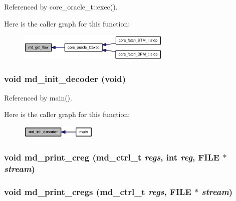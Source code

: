 Referenced by core\_\-oracle\_\-t::exec().

Here is the caller graph for this function:\nopagebreak
\begin{figure}[H]
\begin{center}
\leavevmode
\includegraphics[width=206pt]{machine_8h_b3f57fdb0b3410ba51dc0eafadbaeae8_icgraph}
\end{center}
\end{figure}
\subsubsection[{md\_\-init\_\-decoder}]{\setlength{\rightskip}{0pt plus 5cm}void md\_\-init\_\-decoder (void)}\label{machine_8h_adb08fced61010eb60f1ea634d307228}




Referenced by main().

Here is the caller graph for this function:\nopagebreak
\begin{figure}[H]
\begin{center}
\leavevmode
\includegraphics[width=103pt]{machine_8h_adb08fced61010eb60f1ea634d307228_icgraph}
\end{center}
\end{figure}
\subsubsection[{md\_\-print\_\-creg}]{\setlength{\rightskip}{0pt plus 5cm}void md\_\-print\_\-creg ({\bf md\_\-ctrl\_\-t} {\em regs}, \/  int {\em reg}, \/  FILE $\ast$ {\em stream})}\label{machine_8h_c63d5f30104aa29479fdc91822077b54}


\subsubsection[{md\_\-print\_\-cregs}]{\setlength{\rightskip}{0pt plus 5cm}void md\_\-print\_\-cregs ({\bf md\_\-ctrl\_\-t} {\em regs}, \/  FILE $\ast$ {\em stream})}\label{machine_8h_7bf1c723dc44d4ed1f0da39f006d3383}


